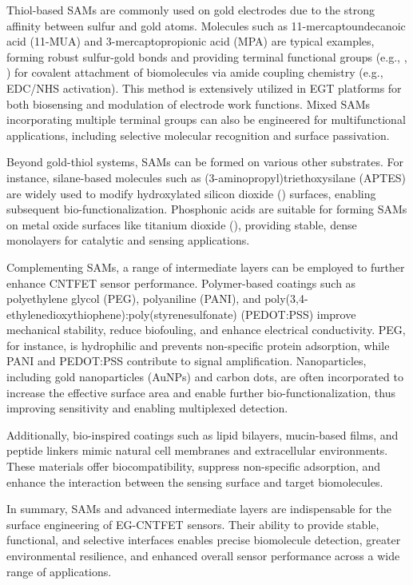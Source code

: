 Thiol-based SAMs are commonly used on gold electrodes due to the strong affinity between sulfur and gold atoms. Molecules such as 11-mercaptoundecanoic acid (11-MUA) and 3-mercaptopropionic acid (MPA) are typical examples, forming robust sulfur-gold bonds and providing terminal functional groups (e.g., , ) for covalent attachment of biomolecules via amide coupling chemistry (e.g., EDC/NHS activation). This method is extensively utilized in EGT platforms for both biosensing and modulation of electrode work functions. Mixed SAMs incorporating multiple terminal groups can also be engineered for multifunctional applications, including selective molecular recognition and surface passivation.

Beyond gold-thiol systems, SAMs can be formed on various other substrates. For instance, silane-based molecules such as (3-aminopropyl)triethoxysilane (APTES) are widely used to modify hydroxylated silicon dioxide () surfaces, enabling subsequent bio-functionalization. Phosphonic acids are suitable for forming SAMs on metal oxide surfaces like titanium dioxide (), providing stable, dense monolayers for catalytic and sensing applications.

Complementing SAMs, a range of intermediate layers can be employed to further enhance CNTFET sensor performance. Polymer-based coatings such as polyethylene glycol (PEG), polyaniline (PANI), and poly(3,4-ethylenedioxythiophene):poly(styrenesulfonate) (PEDOT:PSS) improve mechanical stability, reduce biofouling, and enhance electrical conductivity. PEG, for instance, is hydrophilic and prevents non-specific protein adsorption, while PANI and PEDOT:PSS contribute to signal amplification. Nanoparticles, including gold nanoparticles (AuNPs) and carbon dots, are often incorporated to increase the effective surface area and enable further bio-functionalization, thus improving sensitivity and enabling multiplexed detection. 

Additionally, bio-inspired coatings such as lipid bilayers, mucin-based films, and peptide linkers mimic natural cell membranes and extracellular environments. These materials offer biocompatibility, suppress non-specific adsorption, and enhance the interaction between the sensing surface and target biomolecules.

In summary, SAMs and advanced intermediate layers are indispensable for the surface engineering of EG-CNTFET sensors. Their ability to provide stable, functional, and selective interfaces enables precise biomolecule detection, greater environmental resilience, and enhanced overall sensor performance across a wide range of applications.

